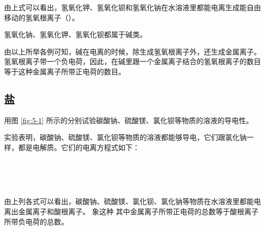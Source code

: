 由上式可以看出，氢氧化钾、氢氧化钡和氢氧化钠在水溶液里都能电离生成能自由移动的氢氧根离子（）。

氢氧化钠、氢氧化钾、氢氧化钡都属于碱类。

由以上所举各例可知，碱在电离的时候，除生成氢氧根离子外，还生成金属离子。
氢氧根离子带一个负电荷，因此，在碱里跟一个金属离子结合的氢氧根离子的数目等于这种金属离子所带正电荷的数目。


\subsection{盐}

\begin{shiyan}
    用图 \ref{fig:5-1} 所示的分别试验碳酸钠、硫酸镁、氯化钡等物质的溶液的导电性。
\end{shiyan}

实验表明，碳酸钠、硫酸镁、氯化钡等物质的溶液都能够导电，它们跟氯化钠一样，都是电解质。它们的电离方程式如下：
\begin{fangchengshi}
     \\
     \\
     \\
\end{fangchengshi}

由上列各式可以看出，碳酸钠、硫酸镁、氯化钡、氯化钠等物质在水溶液里都能电离出金属离子和酸根离子。
象这种
其中金属离子所带正电荷的总数等于酸根离子所带负电荷的总数。


\begin{xiti}






\end{xiti}

